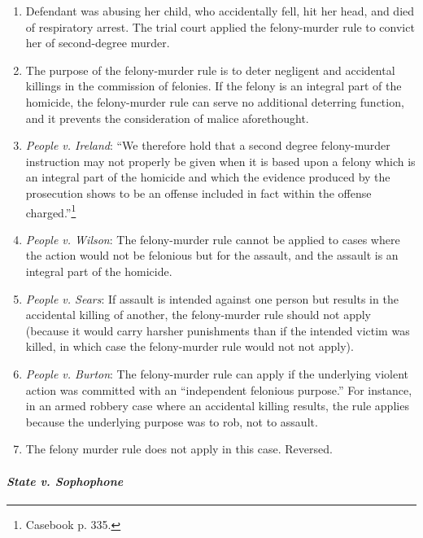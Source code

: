 \begin{enumerate}
    \item Defendant was abusing her child, who accidentally fell, hit her head, and died of respiratory arrest. The trial court applied the felony-murder rule to convict her of second-degree murder.
    \item The purpose of the felony-murder rule is to deter negligent and accidental killings in the commission of felonies. If the felony is an integral part of the homicide, the felony-murder rule can serve no additional deterring function, and it prevents the consideration of malice aforethought.
    \item \emph{People v. Ireland}: ``We therefore hold that a second degree felony-murder instruction may not properly be given when it is based upon a felony which is an integral part of the homicide and which the evidence produced by the prosecution shows to be an offense included in fact within the offense charged.''\footnote{Casebook p. 335.}
    \item \emph{People v. Wilson}: The felony-murder rule cannot be applied to cases where the action would not be felonious but for the assault, and the assault is an integral part of the homicide.
    \item \emph{People v. Sears}: If assault is intended against one person but results in the accidental killing of another, the felony-murder rule should not apply (because it would carry harsher punishments than if the intended victim was killed, in which case the felony-murder rule would not not apply).
    \item \emph{People v. Burton}: The felony-murder rule can apply if the underlying violent action was committed with an ``independent felonious purpose.'' For instance, in an armed robbery case where an accidental killing results, the rule applies because the underlying purpose was to rob, not to assault.
    \item The felony murder rule does not apply in this case. Reversed.
\end{enumerate}

\paragraph{\emph{State v. Sophophone}}

